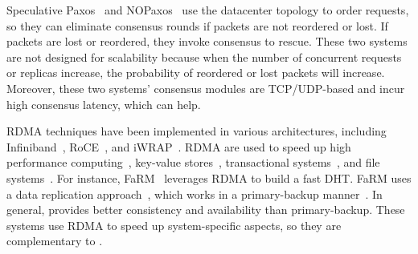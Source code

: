 
Speculative Paxos~\cite{specpaxos:nsdi15} and NOPaxos~\cite{nopaxos:osdi16} 
use the datacenter topology to order requests, so 
they can eliminate consensus rounds if packets are not reordered or lost. If 
packets are lost or reordered, they invoke consensus to rescue.
These two systems are not designed for scalability because when the 
number of concurrent requests or replicas increase, the probability of 
reordered or lost packets will increase. Moreover, these two systems' consensus 
modules are TCP/UDP-based and incur high consensus latency, which 
\xxx can help.

 RDMA techniques have been implemented in various 
architectures, including Infiniband~\cite{infiniband}, RoCE~\cite{roce}, and 
iWRAP~\cite{iwrap}. RDMA are used to speed up high performance 
computing~\cite{openmpi}, key-value 
stores~\cite{pilaf:usenix14,herd:sigcomm14,farm:nsdi14,memcached:rdma}, 
transactional systems~\cite{drtm:sosp15,farm:sosp15,fasst:osdi16}, 
and file 
systems~\cite{gibson:nfs}. For instance, FaRM~\cite{farm:nsdi14} leverages RDMA 
to build a fast DHT. FaRM uses a data replication 
approach~\cite{ramcloud:sosp11}, which works in a primary-backup 
manner~\cite{remus:nsdi08}. In general, \paxos provides better consistency and 
availability than primary-backup. These systems use RDMA to speed up 
system-specific aspects, so they are complementary to \xxx.




